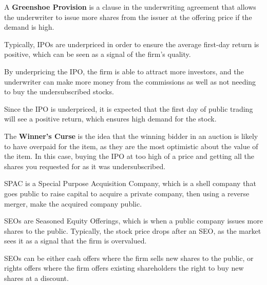 \begin{callout}
A \textbf{Greenshoe Provision} is a clause in the underwriting agreement that allows the 
underwriter to issue more shares from the issuer at the offering price if the 
demand is high.
\end{callout}

Typically, IPOs are underpriced in order to ensure the average first-day return
is positive, which can be seen as a signal of the firm's quality.

By underpricing the IPO, the firm is able to attract more investors, and
the underwriter can make more money from the commissions as well as not needing to buy
the undersubscribed stocks.

Since the IPO is underpriced, it is expected that the first day of public trading will
see a positive return, which ensures high demand for the stock.

\begin{callout}
    The \textbf{Winner's Curse} is the idea that the winning bidder in an auction is 
    likely to have overpaid for the item, as they are the most optimistic 
    about the value of the item. In this case, buying the IPO at too high of a price and getting all
    the shares you requested for as it was undersubscribed.
\end{callout}

SPAC is a Special Purpose Acquisition Company, which is a shell company that 
goes public to raise capital to acquire a private company, then using a reverse merger, 
make the acquired company public.

SEOs are Seasoned Equity Offerings, which is when a public company issues more shares
to the public. Typically, the stock price drops after an SEO, as the market 
sees it as a signal that the firm is overvalued.

SEOs can be either cash offers where the firm sells new shares to the public, or rights offers
where the firm offers existing shareholders the right to buy new shares at a discount.


